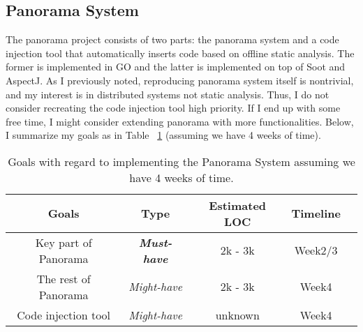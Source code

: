 \subsection{Panorama System}
The panorama project consists of two parts: the panorama system and a code injection tool that automatically inserts code based on offline static analysis. The former is implemented in GO and the latter is implemented on top of Soot and AspectJ. As I previously noted, reproducing panorama system itself is nontrivial, and my interest is in distributed systems not static analysis. Thus, I do not consider recreating the code injection tool high priority. If I end up with some free time, I might consider extending panorama with more functionalities. Below, I summarize my goals as in Table ~\ref{table:1} (assuming we have 4 weeks of time).
\begin{table}[h!]
  \centering
  \begin{tabular}{ |c|c|c|c|c| } 
  \hline
  Goals & Type & Estimated LOC & Timeline \\
  \hline
  Key part of Panorama & \textit{\textbf{Must-have}} & 2k - 3k & Week2/3\\ 
  The rest of Panorama & \textit{Might-have} & 2k - 3k & Week4\\ 
  Code injection tool & \textit{Might-have} & unknown & Week4 \\ 
  \hline
  \end{tabular}
  \caption{Goals with regard to implementing the Panorama System assuming we have 4 weeks of time.}
  \label{table:1}
\end{table}
